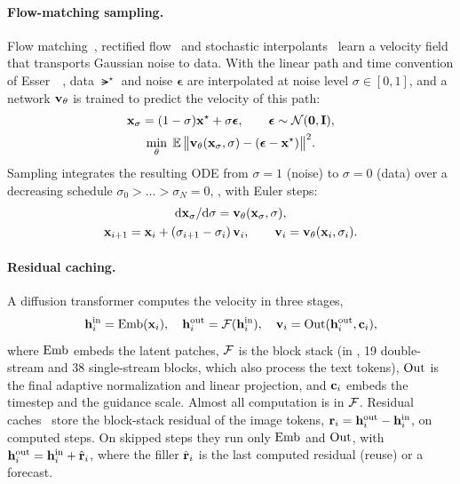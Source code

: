 \paragraph{Flow-matching sampling.}
Flow matching~\cite{lipman2023flow}, rectified flow~\cite{liu2023rectifiedflow} and stochastic
interpolants~\cite{albergo2023interpolants} learn a velocity field that transports Gaussian noise to data. With the
linear path and time convention of Esser~\etal~\cite{esser2024scaling}, data $\lat^\star$ and noise
$\boldsymbol\epsilon$ are interpolated at noise level $\sigma\in[0,1]$, and a network $\mathbf{v}_\theta$ is trained to
predict the velocity of this path:
\begin{gather}
  \mathbf{x}_\sigma=(1-\sigma)\mathbf{x}^\star+\sigma\boldsymbol\epsilon,\qquad
  \boldsymbol\epsilon\sim\mathcal{N}(\mathbf{0},\mathbf{I}),
  \label{eq:interp}\\
  \min_\theta\;\mathbb{E}\,\big\|\mathbf{v}_\theta(\mathbf{x}_\sigma,\sigma)-(\boldsymbol\epsilon-\mathbf{x}^\star)\big\|^2.
  \label{eq:fm}
\end{gather}
Sampling integrates the resulting ODE from $\sigma=1$ (noise) to $\sigma=0$ (data) over a decreasing schedule
$\sigma_0>\dots>\sigma_N=0$, \eg, with Euler steps:
\begin{gather}
  \mathrm{d}\mathbf{x}_\sigma/\mathrm{d}\sigma=\mathbf{v}_\theta(\mathbf{x}_\sigma,\sigma),
  \label{eq:ode}\\
  \mathbf{x}_{i+1}=\mathbf{x}_i+(\sigma_{i+1}-\sigma_i)\,\mathbf{v}_i,\qquad \mathbf{v}_i=\mathbf{v}_\theta(\mathbf{x}_i,\sigma_i).
  \label{eq:euler}
\end{gather}

\paragraph{Residual caching.}
A diffusion transformer computes the velocity in three stages,
\begin{equation}
  \mathbf{h}^{\mathrm{in}}_i=\operatorname{Emb}(\mathbf{x}_i),\quad \mathbf{h}^{\mathrm{out}}_i=\mathcal{F}(\mathbf{h}^{\mathrm{in}}_i),\quad \mathbf{v}_i=\operatorname{Out}(\mathbf{h}^{\mathrm{out}}_i,\mathbf{c}_i),
  \label{eq:dit}
\end{equation}
where $\operatorname{Emb}$ embeds the latent patches, $\mathcal{F}$ is the block stack (in \flux, 19 double-stream and 38
single-stream blocks, which also process the text tokens), $\operatorname{Out}$ is the final adaptive normalization and linear
projection, and $\mathbf{c}_i$ embeds the timestep and the guidance scale. Almost all computation is in $\mathcal{F}$.
Residual caches~\cite{liu2025teacache,chung2026seacache} store the block-stack residual of the image tokens,
$\mathbf{r}_i=\mathbf{h}^{\mathrm{out}}_i-\mathbf{h}^{\mathrm{in}}_i$, on computed steps. On skipped steps they run only $\operatorname{Emb}$ and $\operatorname{Out}$, with
$\mathbf{h}^{\mathrm{out}}_i=\mathbf{h}^{\mathrm{in}}_i+\hat{\mathbf{r}}_i$, where the filler $\hat{\mathbf{r}}_i$ is the last computed residual (reuse) or a forecast.


